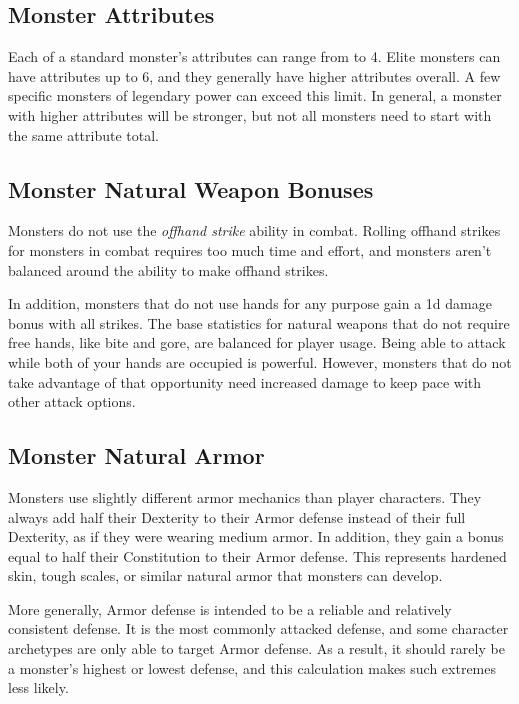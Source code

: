     \subsection{Monster Attributes}\label{Monster Attributes}
        Each of a standard monster's attributes can range from  to 4.
        Elite monsters can have attributes up to 6, and they generally have higher attributes overall.
        A few specific monsters of legendary power can exceed this limit.
        In general, a monster with higher attributes will be stronger, but not all monsters need to start with the same attribute total.

    \subsection{Monster Natural Weapon Bonuses}\label{Monster Natural Weapon Bonuses}
        Monsters do not use the \textit{offhand strike} ability in combat.
        Rolling offhand strikes for monsters in combat requires too much time and effort, and monsters aren't balanced around the ability to make offhand strikes.

        In addition, monsters that do not use hands for any purpose gain a \plus1d damage bonus with all strikes.
        The base statistics for natural weapons that do not require free hands, like bite and gore, are balanced for player usage.
        Being able to attack while both of your hands are occupied is powerful.
        However, monsters that do not take advantage of that opportunity need increased damage to keep pace with other attack options.

    \subsection{Monster Natural Armor}\label{Monster Natural Armor}
        Monsters use slightly different armor mechanics than player characters.
        They always add half their Dexterity to their Armor defense instead of their full Dexterity, as if they were wearing medium armor.
        In addition, they gain a bonus equal to half their Constitution to their Armor defense.
        This represents hardened skin, tough scales, or similar natural armor that monsters can develop.

        More generally, Armor defense is intended to be a reliable and relatively consistent defense.
        It is the most commonly attacked defense, and some character archetypes are only able to target Armor defense.
        As a result, it should rarely be a monster's highest or lowest defense, and this calculation makes such extremes less likely.

